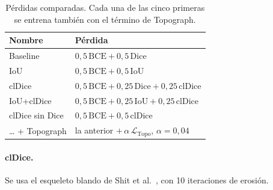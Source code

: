 \begin{table}[ht]
\centering
\begin{tabular}{@{}ll@{}}
\toprule
Nombre & Pérdida\\
\midrule
Baseline & $0{,}5\,\mathrm{BCE}+0{,}5\,\mathrm{Dice}$\\
IoU & $0{,}5\,\mathrm{BCE}+0{,}5\,\mathrm{IoU}$\\
clDice & $0{,}5\,\mathrm{BCE}+0{,}25\,\mathrm{Dice}+0{,}25\,\mathrm{clDice}$\\
IoU+clDice & $0{,}5\,\mathrm{BCE}+0{,}25\,\mathrm{IoU}+0{,}25\,\mathrm{clDice}$\\
clDice sin Dice & $0{,}5\,\mathrm{BCE}+0{,}5\,\mathrm{clDice}$\\
\midrule
\dots{} + Topograph & la anterior $+\,\alpha\,\mathcal{L}_{\mathrm{Topo}}$, $\alpha=0{,}04$\\
\bottomrule
\end{tabular}
\caption{Pérdidas comparadas. Cada una de las cinco primeras se entrena
también con el término de Topograph.}
\label{tab:perdidas}
\end{table}

\paragraph{clDice.} Se usa el esqueleto blando de Shit et
al.~\cite{shit2021}, con 10 iteraciones de erosión.

